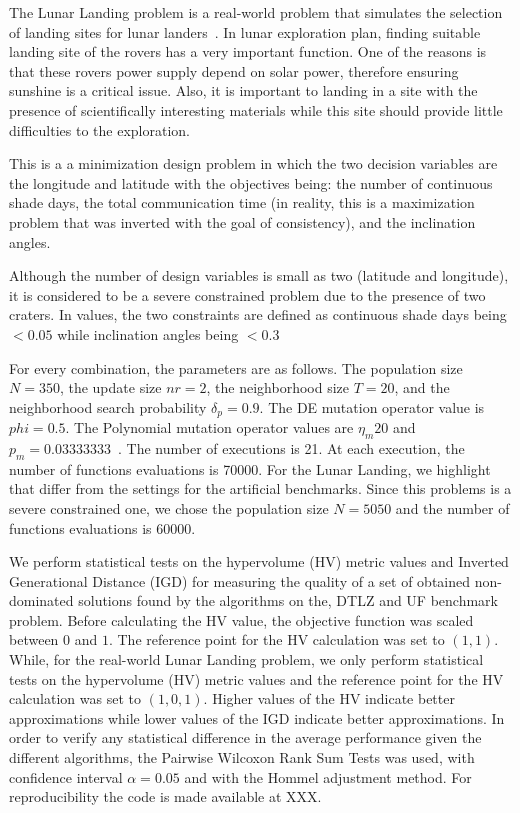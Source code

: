 The Lunar Landing problem is a real-world problem that simulates the selection of landing sites for lunar landers~\citep{MoonOrbitingSatellite2015}. In lunar exploration plan, finding suitable landing site of the rovers has a very important function. One of the reasons is that these rovers power supply depend on solar power, therefore ensuring sunshine is a critical issue. Also, it is important to landing in a site with the presence of scientifically interesting materials while this site should provide little difficulties to the exploration. 

This is a a minimization design problem in which the two decision variables are the longitude and latitude with the objectives being: the number of continuous shade days, the total communication time (in reality, this is a maximization problem that was inverted with the goal of consistency), and the inclination angles. 

Although the number of design variables is small as two (latitude and longitude), it is considered to be a severe constrained problem due to the presence of two craters. In values, the two constraints are defined as continuous shade days  being $ < 0.05$ while inclination angles being $<0.3$

For every combination, the parameters are as follows. The population size $N = 350$, the update size $nr = 2$, the neighborhood size $T = 20$, and the neighborhood search probability $\delta_p = 0.9$. The DE mutation operator value is $phi=0.5$. The Polynomial mutation operator values are $\eta_m 20$ and $p_m = 0.03333333$~\cite{campelo2018moeadr}. The number of executions is 21. At each execution, the number of functions evaluations is 70000. For the Lunar Landing, we highlight that differ from the settings for the artificial benchmarks. Since this problems is a severe constrained one, we chose 
the population size $N = 5050$ and the number of functions evaluations is 60000. 

We perform statistical tests on the hypervolume (HV) metric values and Inverted Generational Distance (IGD) for measuring the quality of a set of obtained non-dominated solutions found by the algorithms on the, DTLZ and UF benchmark problem. Before calculating the HV value, the objective function was scaled between $0$ and $1$. The reference point for the HV calculation was set to $(1, 1)$. While, for the real-world Lunar Landing problem,  we only perform statistical tests on the hypervolume (HV) metric values and the reference point for the HV calculation was set to $(1, 0, 1)$. Higher values of the HV indicate better approximations while lower values of the IGD indicate better approximations. In order to verify any statistical difference in the average performance given the different algorithms, the Pairwise Wilcoxon Rank Sum Tests was used, with confidence interval $\alpha = 0.05$ and with the Hommel adjustment method. For reproducibility the code is made available at XXX.

